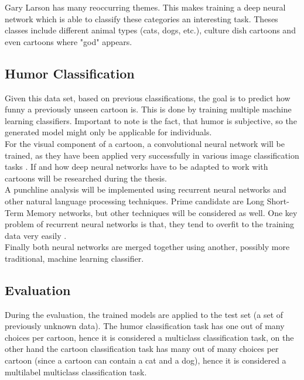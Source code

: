 \documentclass[draft,final]{vutinfth} %
\begin{document}
Gary Larson has many reoccurring themes. This makes training a deep neural network which is able to classify these categories an interesting task. Theses classes include different animal types (cats, dogs, etc.), culture dish cartoons and even cartoons where "god" appears. \\

\subsection {Humor Classification}
Given this data set, based on previous classifications, the goal is to predict how funny a previously unseen cartoon is. This is done by training multiple machine learning classifiers. Important to note is the fact, that humor is subjective, so the generated model might only be applicable for individuals. \\

For the visual component of a cartoon, a convolutional neural network will be trained, as they have been applied very successfully in various image classification tasks \cite{dogsvscats}. If and how deep neural networks have to be adapted to work with cartoons will be researched during the thesis.\\

A punchline analysis will be implemented using recurrent neural networks and other natural language processing techniques. Prime candidate are Long Short-Term Memory networks, but other techniques will be considered as well. One key problem of recurrent neural networks is that, they tend to overfit to the training data very easily \cite[page 4]{reviewRNN}. \\

Finally both neural networks are merged together using another, possibly more traditional, machine learning classifier. \\
 
\subsection {Evaluation}

During the evaluation, the trained models are applied to the test set (a set of previously unknown data). The humor classification task has one out of many choices per cartoon, hence it is considered a multiclass classification task, on the other hand the cartoon classification task has many out of many choices per cartoon (since a cartoon can contain a cat and a dog), hence it is considered a multilabel multiclass classification task. \\
\end{document}
